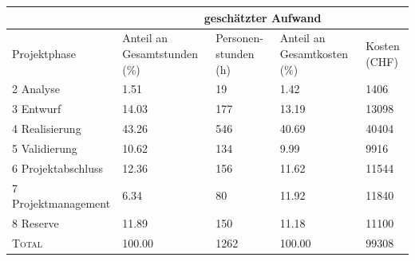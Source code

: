 \begin{center}
    \label{tab:persCost}
    \begin{tabular}{lp{20mm}p{20mm}p{20mm}p{20mm}}
        \toprule
                           & \multicolumn{4}{c}{gesch\"atzter Aufwand} \\
        \midrule
        Projektphase       & Anteil an Gesamtstunden (\%) & Personen-stunden (h) & Anteil an Gesamtkosten (\%) & Kosten (CHF) \\
        \midrule
        2 Analyse            &                         1.51 &                  19 &                        1.42 &        1406 \\
        3 Entwurf            &                        14.03 &                 177 &                       13.19 &       13098 \\
        4 Realisierung       &                        43.26 &                 546 &                       40.69 &       40404 \\
        5 Validierung        &                        10.62 &                 134 &                        9.99 &        9916 \\
        6 Projektabschluss   &                        12.36 &                 156 &                       11.62 &       11544 \\
        7 Projektmanagement  &                         6.34 &                  80 &                       11.92 &       11840 \\
        8 Reserve            &                        11.89 &                 150 &                       11.18 &       11100 \\
        \midrule
        \textsc{Total}       &                       100.00 &                1262 &                      100.00 &       99308 \\
        \bottomrule
    \end{tabular}
\end{center}
